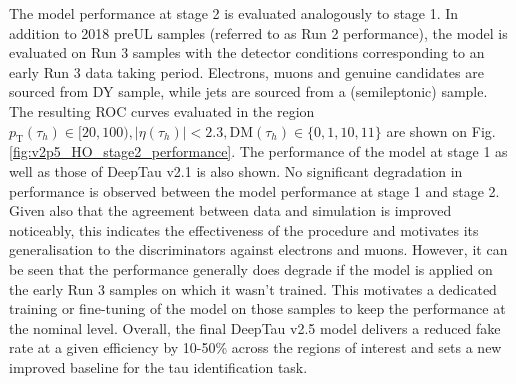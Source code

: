 The model performance at stage 2 is evaluated analogously to stage 1. In addition to 2018 preUL samples (referred to as Run 2 performance), the model is evaluated on Run 3 samples with the detector conditions corresponding to an early Run 3 data taking period. Electrons, muons and genuine \tauh candidates are sourced from DY sample, while jets are sourced from a \ttbar (semileptonic) sample. The resulting ROC curves evaluated in the region $p_\text{T}(\tau_h) \in [20,100), |\eta(\tau_h)| < 2.3, \text{DM}(\tau_h) \in \{0,1,10,11\}$ are shown on Fig. \ref{fig:v2p5_HO_stage2_performance}. The performance of the model at stage 1 as well as those of DeepTau v2.1 is also shown. No significant degradation in performance is observed between the model performance at stage 1 and stage 2. Given also that the agreement between data and simulation is improved noticeably, this indicates the effectiveness of the procedure and motivates its generalisation to the discriminators against electrons and muons. However, it can be seen that the performance generally does degrade if the model is applied on the early Run 3 samples on which it wasn't trained. This motivates a dedicated training or fine-tuning of the model on those samples to keep the performance at the nominal level. Overall, the final DeepTau v2.5 model delivers a reduced fake rate at a given \tauh efficiency by 10-50\% across the regions of interest and sets a new improved baseline for the tau identification task.

